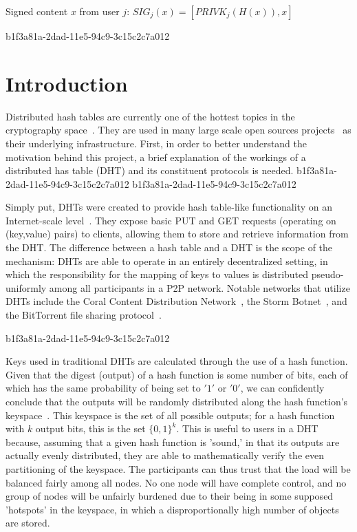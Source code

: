 \documentclass[12pt]{article}
\begin{document}
Signed content $x$ from user $j$: $SIG_j(x) = \left[ PRIVK_j( H(x) ), x \right]$

b1f3a81a-2dad-11e5-94c9-3c15c2c7a012\section{Introduction}
\par Distributed hash tables are currently one of the hottest topics in the cryptography space~\cite{Stoica:2001dj,Rowstron:2001ea,Ratnasamy:2001wn}. They are used in many large scale open sources projects~\cite{Freitas:2013tb,Xu:2010vs,Perfitt:2010fh} as their underlying infrastructure. First, in order to better understand the motivation behind this project, a brief explanation of the workings of a distributed has table (DHT) and its constituent protocols is needed.
b1f3a81a-2dad-11e5-94c9-3c15c2c7a012
b1f3a81a-2dad-11e5-94c9-3c15c2c7a012\par Simply put, DHTs were created to provide hash table-like functionality on an Internet-scale level~\cite{Ratnasamy:2001wn}. They expose basic PUT and GET requests (operating on (key,value) pairs) to clients, allowing them to store and retrieve information from the DHT. The difference between a hash table and a DHT is the scope of the mechanism: DHTs are able to operate in an entirely decentralized setting, in which the responsibility for the mapping of keys to values is distributed pseudo-uniformly among all participants in a P2P network. Notable networks that utilize DHTs include the Coral Content Distribution Network~\cite{Freedman:2004vb}, the Storm Botnet~\cite{Holz:2008uk}, and the BitTorrent file sharing protocol~\cite{Cohen:y1_8mBnw}.

b1f3a81a-2dad-11e5-94c9-3c15c2c7a012\par Keys used in traditional DHTs are calculated through the use of a hash function. Given that the digest (output) of a hash function is some number of bits, each of which has the same probability of being set to $'1'$ or $'0'$, we can confidently conclude that the outputs will be randomly distributed along the hash function's keyspace~. This keyspace is the set of all possible outputs; for a hash function with $k$ output bits, this is the set $\{0,1\}^k$. This is useful to users in a DHT because, assuming that a given hash function is 'sound,' in that its outputs are actually evenly distributed, they are able to mathematically verify the even partitioning of the keyspace. The participants can thus trust that the load will be balanced fairly among all nodes. No one node will have complete control, and no group of nodes will be unfairly burdened due to their being in some supposed 'hotspots' in the keyspace, in which a disproportionally high number of objects are stored.~
\end{document}
